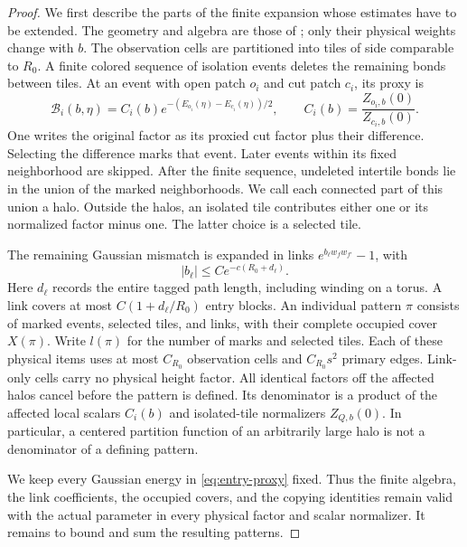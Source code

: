 \begin{proof}
We first describe the parts of the finite expansion whose estimates
have to be extended.  The geometry and algebra are those of
\cite[Sections~4.6--4.7, Theorem~4.6]{F}; only their physical weights change with $b$.
The observation cells are partitioned into tiles of side comparable to
$R_0$.  A finite colored sequence of isolation events deletes the
remaining bonds between tiles.  At an event with open patch $o_i$ and
cut patch $c_i$, its proxy is
\begin{equation}\label{eq:entry-proxy}
 \mathcal B_i(b,\eta)=C_i(b)
                  e^{-(E_{o_i}(\eta)-E_{c_i}(\eta))/2},\qquad
 C_i(b)=\frac{Z_{o_i,b}(0)}{Z_{c_i,b}(0)}.
\end{equation}
One writes the original factor as its proxied cut factor plus their
difference.  Selecting the difference marks that event.  Later events
within its fixed neighborhood are skipped.  After the finite sequence,
undeleted intertile bonds lie in the union of the marked neighborhoods.
We call each connected part of this union a halo.  Outside the halos,
an isolated tile contributes either one or its normalized factor minus
one.  The latter choice is a selected tile.

The remaining Gaussian mismatch is expanded in links
$e^{b_\ell w_fw_{f'}}-1$, with
\begin{equation}\label{eq:entry-links}
                         |b_\ell|\le Ce^{-c(R_0+d_\ell)}.
\end{equation}
Here $d_\ell$ records the entire tagged path length, including winding
on a torus.  A link covers at most $C(1+d_\ell/R_0)$ entry blocks.
An individual pattern $\pi$ consists of marked events, selected tiles,
and links, with their complete occupied cover $X(\pi)$.  Write $l(\pi)$
for the number of marks and selected tiles.  Each of these physical
items uses at most $C_{R_0}$ observation cells and $C_{R_0}s^2$ primary
edges.  Link-only cells carry no physical height factor.  All identical
factors off the affected halos cancel before the pattern is defined.
Its denominator is a product of the affected local scalars $C_i(b)$
and isolated-tile normalizers $Z_{Q,b}(0)$.  In particular, a centered
partition function of an arbitrarily large halo is not a denominator
of a defining pattern.

We keep every Gaussian energy in \eqref{eq:entry-proxy} fixed.  Thus the
finite algebra, the link coefficients, the occupied covers, and the
copying identities remain valid with the actual parameter in every
physical factor and scalar normalizer.  It remains to bound and sum the
resulting patterns.


\end{proof}
